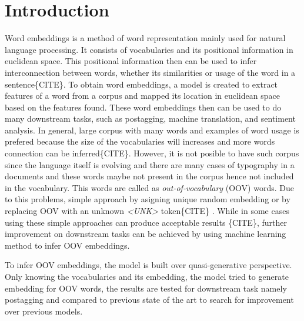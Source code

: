 \chapter{Introduction}
\label{chap:intro}

Word embeddings is a method of word representation mainly used for
natural language processing. It consists of vocabularies and its
positional information in euclidean space. This positional information
then can be used to infer interconnection between words, whether its
similarities or usage of the word in a sentence\{CITE\}. To obtain
word embeddings, a model is created to extract features of a word from
a corpus and mapped its location in euclidean space based on the
features found. These word embeddings then can be used to do many
downstream tasks, such as postagging, machine translation, and
sentiment analysis. In general, large corpus with many words and
examples of word usage is prefered because the size of the
vocabularies will increases and more words connection can be
inferred\{CITE\}. However, it is not posible to have such corpus since
the language itself is evolving and there are many cases of typography
in a documents and these words maybe not present in the corpus hence
not included in the vocabulary. This words are called as
\textit{out-of-vocabulary} (OOV) words. Due to this problems, simple
approach by asigning unique random embedding or by replacing OOV with
an unknown \textit{\textless UNK\textgreater} token\{CITE\} . While in
some cases using these simple approaches can produce acceptable
results \{CITE\}, further improvement on downstream tasks can be
achieved by using machine learning method to infer OOV embeddings.

To infer OOV embeddings, the model is built over quasi-generative
perspective. Only knowing the vocabularies and its embedding, the
model tried to generate embedding for OOV words, the results are
tested for downstream task namely postagging and compared to previous
state of the art to search for improvement over previous models.



